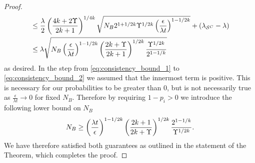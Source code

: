 \begin{proof}
\begin{align}
    &\leq \frac{\lambda}{2}\left( \frac{4k + 2 \Upsilon}{2k+1} \right)^{1/4k} \sqrt{N_B 2^{1 + 1/2k} \Upsilon^{1/2k} \left( \frac{\epsilon}{\lambda t} \right)^{1 - 1/2k}} + (\lambda_{\mathcal{S}^C} - \lambda) \label{eq:consistency_bound_2} \\
    &\leq \lambda \sqrt{N_B \left( \frac{\epsilon}{\lambda t} \right)^{1 - 1/2k} \left( \frac{2k + \Upsilon}{2k+1} \right)^{1/2k} \frac{\Upsilon^{1/2k}}{2^{1-1/k}}  }
\end{align}
as desired. In the step from \eqref{eq:consistency_bound_1} to \eqref{eq:consistency_bound_2} we assumed that the innermost term is positive. This is necessary for our probabilities to be greater than 0, but is not necessarily true as $\frac{\epsilon}{\lambda t} \to 0$ for fixed $N_B$. Therefore by requiring $1 - p_i > 0$ we introduce the following lower bound on $N_B$
\begin{equation}
    N_B \geq \left( \frac{\lambda t}{\epsilon} \right)^{1 - 1/2k} \left( \frac{2k + 1}{2k + \Upsilon} \right)^{1/2k} \frac{2^{1 - 1/k}}{\Upsilon^{1/2k}}. \label{eq:nb_lower_bound}
\end{equation}
We have therefore satisfied both guarantees as outlined in the statement of the Theorem, which completes the proof.
\end{proof}


